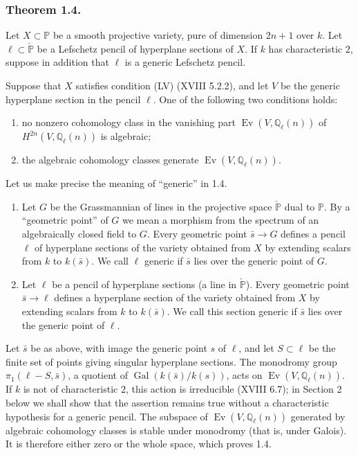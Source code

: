 \subsubsection*{Theorem 1.4.}
Let $X\subset\mathbb P$ be a smooth projective variety, pure of dimension
$2n+1$ over $k$.  Let $\ell\subset\check{\mathbb P}$ be a Lefschetz pencil
of hyperplane sections of $X$.  If $k$ has characteristic $2$, suppose in
addition that $\ell$ is a generic Lefschetz pencil.

Suppose that $X$ satisfies condition (LV) (XVIII 5.2.2), and let $V$ be the
generic hyperplane section in the pencil $\ell$.  One of the following two
conditions holds:
\begin{enumerate}[label=(\alph*)]
\item no nonzero cohomology class in the vanishing part
  $\operatorname{Ev}(V,\mathbb Q_\ell(n))$ of
  $H^{2n}(V,\mathbb Q_\ell(n))$ is algebraic;
\item the algebraic cohomology classes generate
  $\operatorname{Ev}(V,\mathbb Q_\ell(n))$.
\end{enumerate}

Let us make precise the meaning of ``generic'' in 1.4.

\begin{enumerate}[label=(\alph*)]
\item Let $G$ be the Grassmannian of lines in the projective space
  $\check{\mathbb P}$ dual to $\mathbb P$.  By a ``geometric point'' of
  $G$ we mean a morphism from the spectrum of an algebraically closed field
  to $G$.  Every geometric point $\bar s\to G$ defines a pencil $\ell$ of
  hyperplane sections of the variety obtained from $X$ by extending scalars
  from $k$ to $k(\bar s)$.  We call $\ell$ generic if $\bar s$ lies over
  the generic point of $G$.
\item Let $\ell$ be a pencil of hyperplane sections (a line in
  $\check{\mathbb P}$).  Every geometric point $\bar s\to\ell$ defines a
  hyperplane section of the variety obtained from $X$ by extending scalars
  from $k$ to $k(\bar s)$.  We call this section generic if $\bar s$ lies
  over the generic point of $\ell$.
\end{enumerate}

Let $\bar s$ be as above, with image the generic point $s$ of $\ell$, and
let $S\subset\ell$ be the finite set of points giving singular hyperplane
sections.  The monodromy group $\pi_1(\ell-S,\bar s)$, a quotient of
$\operatorname{Gal}(k(\bar s)/k(s))$, acts on
$\operatorname{Ev}(V,\mathbb Q_\ell(n))$.  If $k$ is not of characteristic
$2$, this action is irreducible (XVIII 6.7); in Section 2 below we shall show
that the assertion remains true without a characteristic hypothesis for a
generic pencil.  The subspace of $\operatorname{Ev}(V,\mathbb Q_\ell(n))$
generated by algebraic cohomology classes is stable under monodromy (that is,
under Galois).  It is therefore either zero or the whole space, which proves
1.4.

